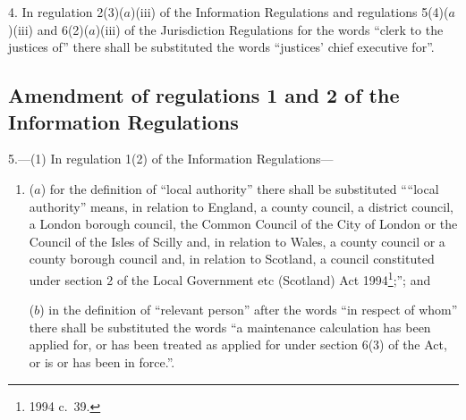 \documentclass[12pt,a4paper]{article}
\begin{document}
4.  In regulation 2(3)($a$)(iii)  of the Information Regulations and regulations 5(4)($a$)(iii)  and 6(2)($a$)(iii)  of the Jurisdiction Regulations for the words “clerk to the justices of” there shall be substituted the words “justices' chief executive for”.

\subsection[5. Amendment of regulations 1 and 2 of the Information Regulations]{Amendment of regulations 1 and 2 of the Information Regulations}

5.---(1)  In regulation 1(2) of the Information Regulations—
\begin{enumerate}\item[]
($a$) for the definition of “local authority” there shall be substituted ““local authority” means, in relation to England, a county council, a district council, a London borough council, the Common Council of the City of London or the Council of the Isles of Scilly and, in relation to Wales, a county council or a county borough council and, in relation to Scotland, a council constituted under section 2 of the Local Government etc (Scotland) Act 1994\footnote{1994 c.\ 39.};”; and

($b$) in the definition of “relevant person” after the words “in respect of whom” there shall be substituted the words “a maintenance calculation has been applied for, or has been treated as applied for under section 6(3) of the Act, or is or has been in force.”.
\end{enumerate}
\end{document}
